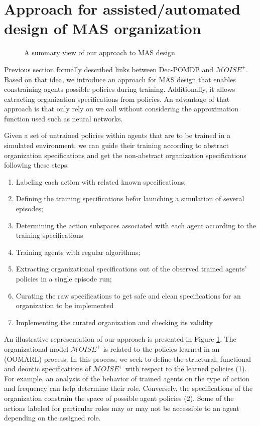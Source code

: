 \documentclass[runningheads]{llncs}
\begin{document}
\section{Approach for assisted/automated design of MAS organization}

\begin{figure}[h!]
    \centering
    
    \caption{A summary view of our approach to MAS design}
    \label{fig:design_approach}
\end{figure}

Previous section formally described links between Dec-POMDP and $\mathcal{M}OISE^+$. Based on that idea, we introduce an approach for MAS design that enables constraining agents possible policies during training. Additionally, it allows extracting organization specifications from policies. An advantage of that approach is that only rely on  we call  without considering the approximation function used such as neural networks.

Given a set of untrained policies within agents that are to be trained in a simulated environment, we can guide their training according to abstract organization specifications and get the non-abstract organization specifications following these steps:
\begin{enumerate}
    \item Labeling each action with related known specifications;
    \item Defining the training specifications befor launching a simulation of several episodes;
    \item Determining the action subspaces associated with each agent according to the training specifications
    \item Training agents with regular algorithms;
    \item Extracting organizational specifications out of the observed trained agents' policies in a single episode run;
    \item Curating the raw specifications to get safe and clean specifications for an organization to be implemented
    \item Implementing the curated organization and checking its validity
\end{enumerate}

An illustrative representation of our approach is presented in Figure \ref{fig:design_approach}. The organizational model $\mathcal{M}OISE^{+}$ is related to the policies learned in an  (OOMARL) process. In this process, we seek to define the structural, functional and deontic specifications of $\mathcal{M}OISE^{+}$ with respect to the learned policies (1). For example, an analysis of the behavior of trained agents on the type of action and frequency can help determine their role. Conversely, the specifications of the organization constrain the space of possible agent policies (2). Some of the actions labeled for particular roles may or may not be accessible to an agent depending on the assigned role.
\end{document}
